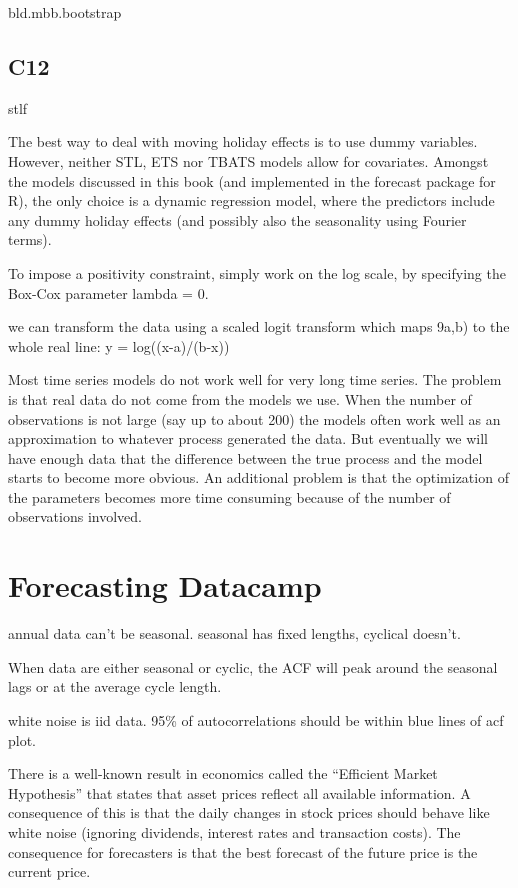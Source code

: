 \documentclass[]{book}
\begin{document}
bld.mbb.bootstrap

\subsection{C12}\label{c12}

stlf

The best way to deal with moving holiday effects is to use dummy
variables. However, neither STL, ETS nor TBATS models allow for
covariates. Amongst the models discussed in this book (and implemented
in the forecast package for R), the only choice is a dynamic regression
model, where the predictors include any dummy holiday effects (and
possibly also the seasonality using Fourier terms).

To impose a positivity constraint, simply work on the log scale, by
specifying the Box-Cox parameter lambda = 0.

we can transform the data using a scaled logit transform which maps
9a,b) to the whole real line: y = log((x-a)/(b-x))

Most time series models do not work well for very long time series. The
problem is that real data do not come from the models we use. When the
number of observations is not large (say up to about 200) the models
often work well as an approximation to whatever process generated the
data. But eventually we will have enough data that the difference
between the true process and the model starts to become more obvious. An
additional problem is that the optimization of the parameters becomes
more time consuming because of the number of observations involved.

\section{Forecasting Datacamp}\label{forecasting-datacamp}

annual data can't be seasonal. seasonal has fixed lengths, cyclical
doesn't.

When data are either seasonal or cyclic, the ACF will peak around the
seasonal lags or at the average cycle length.

white noise is iid data. 95\% of autocorrelations should be within blue
lines of acf plot.

There is a well-known result in economics called the ``Efficient Market
Hypothesis'' that states that asset prices reflect all available
information. A consequence of this is that the daily changes in stock
prices should behave like white noise (ignoring dividends, interest
rates and transaction costs). The consequence for forecasters is that
the best forecast of the future price is the current price.
\end{document}

